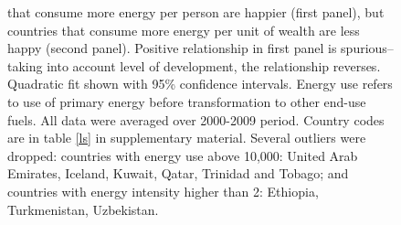 \documentclass[10pt, letterpaper]{article}
\begin{document}
\begin{spacing}{1.0}
\begin{figure}[H]
{   that consume more energy per person are happier (first panel), but countries
   that consume more energy per unit of wealth are less happy (second
   panel). Positive relationship in first panel is spurious--taking into
   account level of development, the relationship reverses. 
Quadratic fit shown with 95\%  confidence intervals. Energy use
   refers to use of primary energy before transformation to other end-use
   fuels. All data were averaged over 2000-2009 period.  %
 Country codes are in table \ref{ls} in supplementary material. 
 Several outliers were dropped: countries with energy use above 10,000: United Arab Emirates, Iceland, Kuwait, Qatar, Trinidad and Tobago; and countries with energy intensity higher than 2: Ethiopia, Turkmenistan, Uzbekistan.}\label{couWvsLsEnePerGdp2} 
\end{figure}



\end{spacing}
\end{document}
